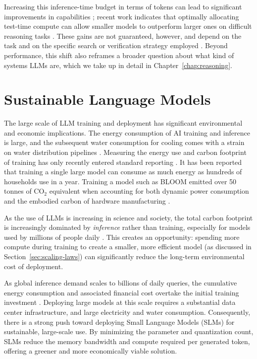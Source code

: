 Increasing this inference-time budget in terms of tokens can lead to significant improvements in capabilities \citep{du2024debate}; recent work indicates that optimally allocating test-time compute can allow smaller models to outperform  larger ones on difficult reasoning tasks \citep{snell2024scaling}. These gains are not guaranteed, however, and depend  on the task and on the specific search or verification strategy employed \citep{stechly2023gpt}. Beyond  performance, this shift also reframes a broader question about what kind of systems LLMs are, which we take up in detail  in Chapter~\ref{chap:reasoning}.


\section{Sustainable Language Models}
\label{sec:sustainable}
The large scale of LLM training and deployment has significant environmental and economic implications. The energy consumption of AI training and inference is large, %
and the subsequent water consumption for cooling comes with a strain on  water distribution pipelines \citep{10.1145/3724499, jegham2025hungryaibenchmarkingenergy}. Measuring the energy use and carbon footprint of training has only recently entered standard reporting \citep{ding2024sustainable}. It has been reported that training a single large model can consume as much energy as hundreds of households use in a year. Training a model such as BLOOM emitted over 50 tonnes of CO$_2$ equivalent when accounting for both dynamic power consumption and the embodied carbon of hardware manufacturing \citep{JMLR:v24:23-0069}.

As the use of LLMs is increasing in science and society, the total carbon footprint is increasingly dominated by \emph{inference} rather than training, especially for models used by millions of people daily \citep{ozcan2025quantifying, wu2022sustainable, samsi2023words}. This creates an opportunity: spending more compute during training to create a smaller, more efficient model (as discussed in Section~\ref{sec:scaling-laws}) can significantly reduce the long-term environmental cost of deployment.

As global inference demand scales to billions of daily queries, the cumulative energy consumption and associated financial cost  overtake the initial training investment \citep{faiz2024llmcarbon}. Deploying large models at this scale requires a substantial data center infrastructure, and large electricity and water consumption. Consequently, there is a strong push toward deploying Small Language Models (SLMs) for sustainable, large-scale use. By minimizing the parameter and quantization count, SLMs reduce the memory bandwidth and compute required per generated token, offering a greener and more economically viable solution.

